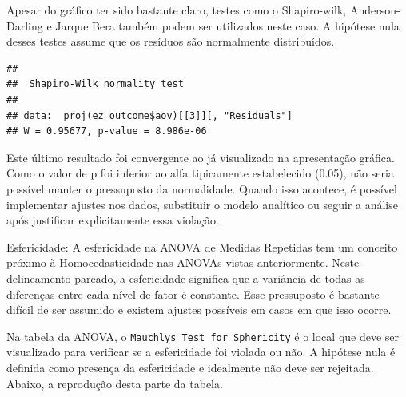 \documentclass[
]{book}
\newenvironment{Shaded}{\begin{snugshade}}{\end{snugshade}}
\newcommand{\DataTypeTok}[1]{\textcolor[rgb]{0.13,0.29,0.53}{#1}}
\newcommand{\DecValTok}[1]{\textcolor[rgb]{0.00,0.00,0.81}{#1}}
\newcommand{\KeywordTok}[1]{\textcolor[rgb]{0.13,0.29,0.53}{\textbf{#1}}}
\newcommand{\NormalTok}[1]{#1}
\newcommand{\OperatorTok}[1]{\textcolor[rgb]{0.81,0.36,0.00}{\textbf{#1}}}
\newcommand{\StringTok}[1]{\textcolor[rgb]{0.31,0.60,0.02}{#1}}
\begin{document}
Apesar do gráfico ter sido bastante claro, testes como o Shapiro-wilk, Anderson-Darling e Jarque Bera também podem ser utilizados neste caso. A hipótese nula desses testes assume que os resíduos são normalmente distribuídos.

\begin{Shaded}
\end{Shaded}

\begin{verbatim}
## 
##  Shapiro-Wilk normality test
## 
## data:  proj(ez_outcome$aov)[[3]][, "Residuals"]
## W = 0.95677, p-value = 8.986e-06
\end{verbatim}

Este último resultado foi convergente ao já visualizado na apresentação gráfica. Como o valor de p foi inferior ao alfa tipicamente estabelecido (0.05), não seria possível manter o pressuposto da normalidade. Quando isso acontece, é possível implementar ajustes nos dados, substituir o modelo analítico ou seguir a análise após justificar explicitamente essa violação.

Esfericidade: A esfericidade na ANOVA de Medidas Repetidas tem um conceito próximo à Homocedasticidade nas ANOVAs vistas anteriormente. Neste delineamento pareado, a esfericidade significa que a variância de todas as diferenças entre cada nível de fator é constante. Esse pressuposto é bastante difícil de ser assumido e existem ajustes possíveis em casos em que isso ocorre.

Na tabela da ANOVA, o \texttt{Mauchly\textquotesingle{}s\ Test\ for\ Sphericity} é o local que deve ser visualizado para verificar se a esfericidade foi violada ou não. A hipótese nula é definida como presença da esfericidade e idealmente não deve ser rejeitada. Abaixo, a reprodução desta parte da tabela.

\begin{Shaded}
\end{Shaded}
\end{document}
